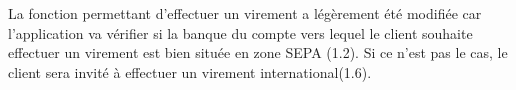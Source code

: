 La fonction permettant d'effectuer un virement a légèrement été modifiée car l'application
va vérifier si la banque du compte vers lequel le client souhaite effectuer un virement est bien située en zone SEPA (1.2).
Si ce n'est pas le cas, le client sera invité à effectuer un virement international(1.6).